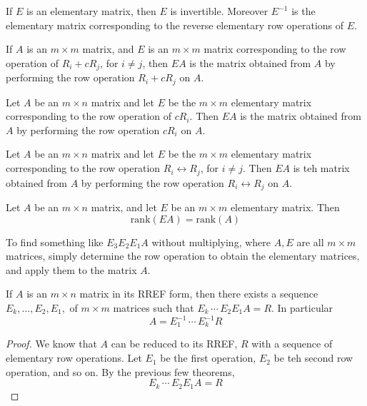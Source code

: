 \documentclass[english, 12pt]{article}
\begin{document}
\begin{thrm}
If $E$ is an elementary matrix, then $E$ is invertible. Moreover $E^{-1}$ is the elementary matrix corresponding to the reverse elementary row operations of $E$.
\end{thrm}

\begin{thrm}
If $A$ is an $m \times m$ matrix, and $E$ is an $m \times m$ matrix corresponding to the row operation of $R_i + cR_j$, for $i \neq j$, then $EA$ is the matrix obtained from $A$ by performing the row operation $R_i + cR_j$ on $A$.
\end{thrm}

\begin{thrm}
Let $A$ be an $m \times n$ matrix and let $E$ be the $m \times m$ elementary matrix corresponding to the row operation of $cR_i$. Then $EA$ is the matrix obtained from $A$ by performing the row operation $cR_i$ on $A$.
\end{thrm}

\begin{thrm}
Let $A$ be an $m \times n$ matrix and let $E$ be the $m \times m$ elementary matrix corresponding to the row operation $R_i \leftrightarrow R_j $, for $ i \neq j$. Then $EA$ is teh matrix obtained from $A$ by performing the row operation $R_i \leftrightarrow R_j$ on $A$.
\end{thrm}

\begin{thrm}
Let $A$ be an $m \times n$ matrix, and let $E$ be an $m \times m$ elementary matrix. Then
\[\text{rank}(EA) = \text{rank}(A)\]
\end{thrm}

\begin{note}
To find something like $E_3E_2E_1A$ without multiplying, where $A,E$ are all $m \times m$ matrices, simply determine the row operation to obtain the elementary matrices, and apply them to the matrix $A$.
\end{note}

\begin{thrm}
If $A$ is an $m \times n$ matrix in its RREF form, then there exists a sequence $E_k,\dots,E_2,E_1,$ of $m \times m$ matrices such that
$E_k\,\cdots\,E_2 E_1 A = R$. In particular
\[A = E_1^{-1}\,\cdots\,E_k^{-1}R\]

\begin{proof}
We know that $A$ can be reduced to its RREF, $R$ with a sequence of elementary row operations. Let $E_1$ be the first operation, $E_2$ be teh second row operation, and so on. By the previous few theorems,
\[E_k\,\cdots\,E_2 E_1 A = R\]
\end{proof}
\end{thrm}
\end{document}
